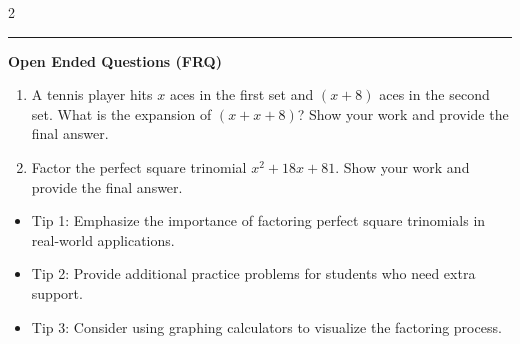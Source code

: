 \documentclass[10pt]{article}
\begin{document}
\begin{multicols}{2}
\begin{enumerate}[label=\textbf{Q\arabic*.}, leftmargin=*, itemsep=6pt, parsep=0pt]
\end{enumerate}
\end{multicols}

\vspace{-0.2cm}
\hrule
\vspace{0.2cm}
\textbf{\small Open Ended Questions (FRQ)}
\begin{enumerate}[label=\textbf{Q\arabic*.}, start=9, itemsep=5pt, topsep=0pt]

  \item \small A tennis player hits $x$ aces in the first set and $(x+8)$ aces in the second set. What is the expansion of $(x+x+8)$? Show your work and provide the final answer. \vspace{2cm}

  \item \small Factor the perfect square trinomial $x^2 + 18x + 81$. Show your work and provide the final answer. \vspace{2cm}

\end{enumerate}

\vfill

\begin{tcolorbox}[colback=blue!5, colframe=mainblue!50, title=\small \textbf{Chef's Tips}, fonttitle=\bfseries, bottom=1mm]
\begin{itemize}[noitemsep, topsep=2pt, leftmargin=0.5cm]
  \item \scriptsize Tip 1: Emphasize the importance of factoring perfect square trinomials in real-world applications.\item \scriptsize Tip 2: Provide additional practice problems for students who need extra support.\item \scriptsize Tip 3: Consider using graphing calculators to visualize the factoring process.
\end{itemize}
\end{tcolorbox}
\end{document}
